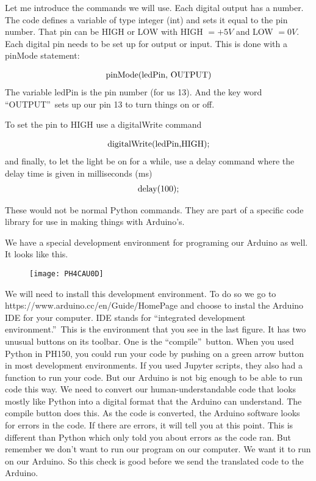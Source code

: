 Let me introduce the commands we will use. Each digital output has a number.
The code defines a variable of type integer (int) and sets it equal to the
pin number. That pin can be HIGH or LOW with HIGH $=+5\unit{V}$ and LOW $=0%
\unit{V}$. Each digital pin needs to be set up for output or input. This is
done with a pinMode statement:

\begin{equation*}
	\begin{tabular}{l}
		pinMode(ledPin, OUTPUT)
	\end{tabular}
\end{equation*}
The variable ledPin is the pin number (for us 13). And the key word
\textquotedblleft OUTPUT\textquotedblright\ sets up our pin 13 to turn
things on or off.

To set the pin to HIGH use a digitalWrite command

\begin{equation*}
	\begin{tabular}{l}
		digitalWrite(ledPin,HIGH);
	\end{tabular}
\end{equation*}
and finally, to let the light be on for a while, use a delay command where
the delay time is given in milliseconds (ms)%
\begin{equation*}
	\begin{tabular}{l}
		delay(100);
	\end{tabular}
\end{equation*}

These would not be normal Python commands. They are part of a specific code
library for use in making things with Arduino's.

We have a special development environment for programing our Arduino as
well. It looks like this. 

\begin{figure}[h!]
	\centering
	\texttt{[image: PH4CAU0D]}
\end{figure}

We will need to install this
development environment. To do so we go to
https://www.arduino.cc/en/Guide/HomePage and choose to instal the Arduino
IDE for your computer. IDE stands for \textquotedblleft integrated
development environment.\textquotedblright\ This is the environment that you
see in the last figure. It has two unusual buttons on its toolbar. One is
the \textquotedblleft compile\textquotedblright\ button. When you used
Python in PH150, you could run your code by pushing on a green arrow button
in most development environments. If you used Jupyter scripts, they also had
a function to run your code. But our Arduino is not big enough to be able to
run code this way. We need to convert our human-understandable code that
looks mostly like Python into a digital format that the Arduino can
understand. The compile button does this. As the code is converted, the
Arduino software looks for errors in the code. If there are errors, it will
tell you at this point. This is different than Python which only told you
about errors as the code ran. But remember we don't want to run our program
on our computer. We want it to run on our Arduino. So this check is good
before we send the translated code to the Arduino.

